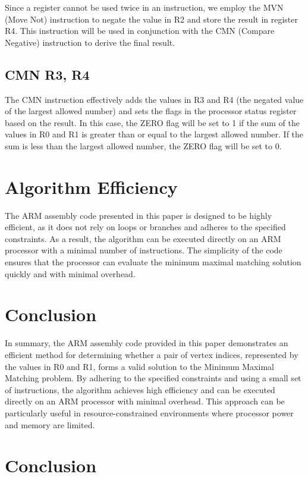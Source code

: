 Since a register cannot be used twice in an instruction, we employ the MVN (Move Not) instruction to negate the value in R2 and store the result in register R4. This instruction will be used in conjunction with the CMN (Compare Negative) instruction to derive the final result.

\subsection{CMN R3, R4}

The CMN instruction effectively adds the values in R3 and R4 (the negated value of the largest allowed number) and sets the flags in the processor status register based on the result. In this case, the ZERO flag will be set to 1 if the sum of the values in R0 and R1 is greater than or equal to the largest allowed number. If the sum is less than the largest allowed number, the ZERO flag will be set to 0.

\section{Algorithm Efficiency}

The ARM assembly code presented in this paper is designed to be highly efficient, as it does not rely on loops or branches and adheres to the specified constraints. As a result, the algorithm can be executed directly on an ARM processor with a minimal number of instructions. The simplicity of the code ensures that the processor can evaluate the minimum maximal matching solution quickly and with minimal overhead.

\section{Conclusion}

In summary, the ARM assembly code provided in this paper demonstrates an efficient method for determining whether a pair of vertex indices, represented by the values in R0 and R1, forms a valid solution to the Minimum Maximal Matching problem. By adhering to the specified constraints and using a small set of instructions, the algorithm achieves high efficiency and can be executed directly on an ARM processor with minimal overhead. This approach can be particularly useful in resource-constrained environments where processor power and memory are limited.

\section{Conclusion}
\label{sec:conclusion}

